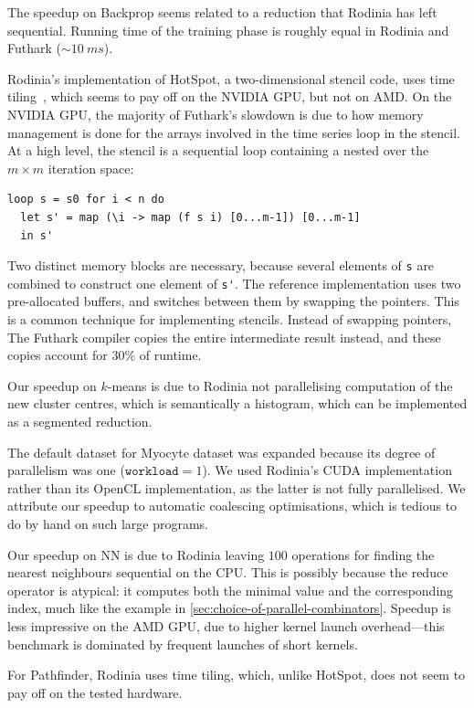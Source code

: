 The speedup on Backprop seems related to a reduction that Rodinia has
left sequential.  Running time of the training phase is roughly equal
in Rodinia and Futhark ($\sim10~ms$).

Rodinia's implementation of HotSpot, a two-dimensional stencil code,
uses time tiling~\cite{HexaTiling}, which seems to pay off on the
NVIDIA GPU, but not on AMD.  On the NVIDIA GPU, the majority of
Futhark's slowdown is due to how memory management is done for the
arrays involved in the time series loop in the stencil.  At a high
level, the stencil is a sequential loop containing a nested 
over the $m\times{}m$ iteration space:

\begin{lstlisting}
loop s = s0 for i < n do
  let s' = map (\i -> map (f s i) [0...m-1]) [0...m-1]
  in s'
\end{lstlisting}

Two distinct memory blocks are necessary, because several elements of
\lstinline{s} are combined to construct one element of \lstinline{s'}.
The reference implementation uses two pre-allocated buffers, and
switches between them by swapping the pointers.  This is a common
technique for implementing stencils.  Instead of swapping pointers,
The Futhark compiler copies the entire intermediate result instead,
and these copies account for $30\%$ of runtime.

Our speedup on $k$-means is due to Rodinia not parallelising
computation of the new cluster centres, which is semantically a
histogram, which can be implemented as a segmented reduction.

The default dataset for Myocyte dataset was expanded because its
degree of parallelism was one ($\texttt{workload}=1$).  We used
Rodinia's CUDA implementation rather than its OpenCL implementation,
as the latter is not fully parallelised.  We attribute our speedup to
automatic coalescing optimisations, which is tedious to do by hand on
such large programs.

Our speedup on NN is due to Rodinia leaving $100$ 
operations for finding the nearest neighbours sequential on the CPU.
This is possibly because the reduce operator is atypical: it computes
both the minimal value and the corresponding index, much like the
example in \cref{sec:choice-of-parallel-combinators}.  Speedup is less
impressive on the AMD GPU, due to higher kernel launch overhead---this
benchmark is dominated by frequent launches of short kernels.

For Pathfinder, Rodinia uses time tiling, which, unlike HotSpot, does
not seem to pay off on the tested hardware.

